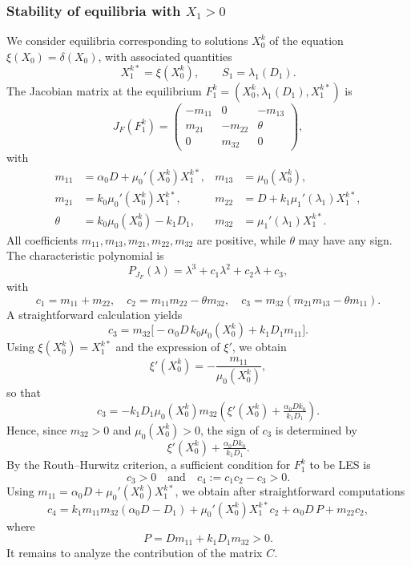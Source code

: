 \documentclass[runningheads]{llncs}
\begin{document}
\subsubsection{Stability of equilibria with $X_1>0$}
We consider equilibria corresponding to solutions $X_0^k$ of the equation
$\xi(X_0)=\delta(X_0)$, with associated quantities
\[
X_1^{k*}=\xi(X_0^k), \qquad S_1=\lambda_1(D_1).
\]
The Jacobian matrix at the equilibrium $F_1^{k}=(X_0^k,\lambda_1(D_1),X_1^{k*})$ is
\[
J_F(F_1^{k}) =
\begin{pmatrix}
-m_{11} & 0 & -m_{13} \\
 m_{21} & -m_{22} & \theta \\
 0      & m_{32}  & 0
\end{pmatrix},
\]
with
\[
\begin{aligned}
m_{11} &= \alpha_0 D + \mu_0'(X_0^k) X_1^{k*}, 
& m_{13} &= \mu_0(X_0^k), \\
m_{21} &= k_0 \mu_0'(X_0^k) X_1^{k*}, 
& m_{22} &= D + k_1 \mu_1'(\lambda_1) X_1^{k*}, \\
\theta &= k_0 \mu_0(X_0^k) - k_1 D_1, 
& m_{32} &= \mu_1'(\lambda_1) X_1^{k*}.
\end{aligned}
\]
All coefficients $m_{11}, m_{13}, m_{21}, m_{22}, m_{32}$ are positive, while $\theta$ may have any sign.  
The characteristic polynomial is
\[
P_{J_F}(\lambda)=\lambda^3 + c_1 \lambda^2 + c_2 \lambda + c_3,
\]
with
\[
c_1 = m_{11}+m_{22}, \quad 
c_2 = m_{11}m_{22} - \theta m_{32}, \quad 
c_3 = m_{32}(m_{21}m_{13}-\theta m_{11}).
\]
A straightforward calculation yields
\[
c_3 = m_{32} \Big[ - \alpha_0 D \, k_0 \mu_0(X_0^k) + k_1 D_1 m_{11} \Big].
\]
Using $\xi(X_0^k)=X_1^{k*}$ and the expression of $\xi'$, we obtain
\[
\xi'(X_0^k) = -\frac{m_{11}}{\mu_0(X_0^k)},
\]
so that
\[
c_3 = - k_1 D_1 \mu_0(X_0^k) m_{32}
\left(
\xi'(X_0^k) + \tfrac{\alpha_0 D k_0}{k_1 D_1}
\right).
\]
Hence, since $m_{32}>0$ and $\mu_0(X_0^k)>0$, the sign of $c_3$ is determined by
\[
\xi'(X_0^k) + \tfrac{\alpha_0 D k_0}{k_1 D_1}.
\]
By the Routh--Hurwitz criterion, a sufficient condition for $F_1^k$ to be LES is
\[
c_3>0 \quad \text{and} \quad c_4:=c_1c_2-c_3>0.
\]
Using $m_{11} = \alpha_0 D + \mu_0'(X_0^k) X_1^{k*}$, we obtain after straightforward computations
\begin{equation}                 \label{ExpC4}
c_4 =
k_1 m_{11}m_{32}  (\alpha_0 D - D_1) + \mu_0'(X_0^k) X_1^{k*} c_2
+ \alpha_0 D \, P + m_{22} c_2,
\end{equation}
where
\[
P = D m_{11} + k_1 D_1 m_{32} > 0.
\]
 \medskip
It remains to analyze the contribution of the matrix $C$.
\end{document}
